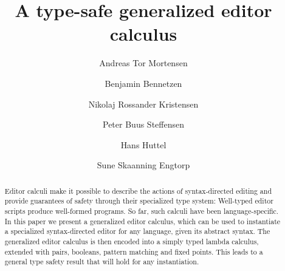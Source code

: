 \documentclass[sigplan,review]{acmart}
\begin{document}
\title{A type-safe generalized editor calculus}



\author{Andreas Tor Mortensen}


\author{Benjamin Bennetzen}


\author{Nikolaj Rossander Kristensen}

\author{Peter Buus Steffensen}
\authornotemark[1]


\author{Hans Huttel}
\author{Sune Skaanning Engtorp}
\authornotemark[2]



\renewcommand{\shortauthors}{Bennetzen et al.}

\begin{abstract}
  
  Editor calculi make it possible to describe the actions of
  syntax-directed editing and provide guarantees of safety through 
  their specialized type system: Well-typed editor scripts produce
  well-formed programs. So far, such calculi have been
  language-specific. In this paper we present a generalized editor
  calculus, which can be used to instantiate a specialized
  syntax-directed editor for any language, given its abstract
  syntax. The generalized editor calculus is then encoded into a
  simply typed lambda calculus, extended with pairs, booleans, pattern
  matching and fixed points. This leads to a general type safety
  result that will hold for any instantiation.
  
\end{abstract}
\end{document}
